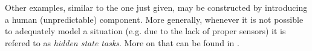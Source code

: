 \begin{solution}
Other examples, similar to the one just given, may be constructed by introducing a human (unpredictable) component.
More generally, whenever it is not possible to adequately model a situation (e.g. due to the lack of proper sensors) it is refered to as \textit{hidden state tasks}.
More on that can be found in \cite{WhiteheadStevenD1995Rlon}.

\end{solution}

